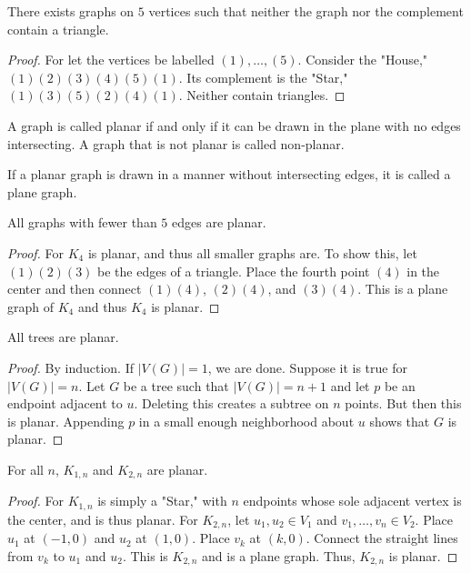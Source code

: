         \begin{theorem}
        There exists graphs on $5$ vertices such that neither the graph nor the complement contain a triangle.
        \end{theorem}
        \begin{proof}
        For let the vertices be labelled $(1),\hdots,(5)$. Consider the "House," $(1)(2)(3)(4)(5)(1)$. Its complement is the "Star," $(1)(3)(5)(2)(4)(1)$. Neither contain triangles.
        \end{proof}
        \begin{definition}
        A graph is called planar if and only if it can be drawn in the plane with no edges intersecting. A graph that is not planar is called non-planar.
        \end{definition}
        \begin{definition}
        If a planar graph is drawn in a manner without intersecting edges, it is called a plane graph.
        \end{definition}
        \begin{corollary}
        All graphs with fewer than $5$ edges are planar.
        \end{corollary}
        \begin{proof}
        For $K_4$ is planar, and thus all smaller graphs are. To show this, let $(1)(2)(3)$ be the edges of a triangle. Place the fourth point $(4)$ in the center and then connect $(1)(4)$, $(2)(4)$, and $(3)(4)$. This is a plane graph of $K_4$ and thus $K_4$ is planar.
        \end{proof}
        \begin{theorem}
        All trees are planar.
        \end{theorem}
        \begin{proof}
        By induction. If $|V(G)| = 1$, we are done. Suppose it is true for $|V(G)| = n$. Let $G$ be a tree such that $|V(G)| = n+1$ and let $p$ be an endpoint adjacent to $u$. Deleting this creates a subtree on $n$ points. But then this is planar. Appending $p$ in a small enough neighborhood about $u$ shows that $G$ is planar.
        \end{proof}
        \begin{theorem}
        For all $n$, $K_{1,n}$ and $K_{2,n}$ are planar.
        \end{theorem}
        \begin{proof}
        For $K_{1,n}$ is simply a "Star," with $n$ endpoints whose sole adjacent vertex is the center, and is thus planar. For $K_{2,n}$, let $u_1,u_2 \in V_1$ and $v_1,\hdots, v_n \in V_2$. Place $u_1$ at $(-1,0)$ and $u_2$ at $(1,0)$. Place $v_k$ at $(k,0)$. Connect the straight lines from $v_k$ to $u_1$ and $u_2$. This is $K_{2,n}$ and is a plane graph. Thus, $K_{2,n}$ is planar.
        \end{proof}
